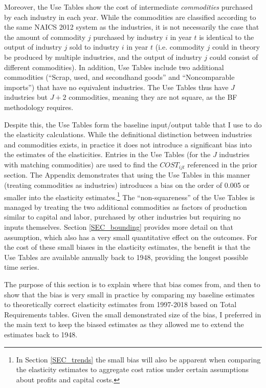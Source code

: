 Moreover, the Use Tables show the cost of intermediate \textit{commodities} purchased by each industry in each year. While the commodities are classified according to the same NAICS 2012 system as the industries, it is not necessarily the case that the amount of commodity $j$ purchased by industry $i$ in year $t$ is identical to the output of industry $j$ sold to industry $i$ in year $t$ (i.e. commodity $j$ could in theory be produced by multiple industries, and the output of industry $j$ could consist of different commodities). In addition, Use Tables include two additional commodities (``Scrap, used, and secondhand goods'' and ``Noncomparable imports'') that have no equivalent industries. The Use Tables thus have $J$ industries but $J+2$ commodities, meaning they are not square, as the BF methodology requires. 

Despite this, the Use Tables form the baseline input/output table that I use to do the elasticity calculations. While the definitional distinction between industries and commodities exists, in practice it does not introduce a significant bias into the estimates of the elasticities. Entries in the Use Tables (for the $J$ industries with matching commodities) are used to find the $COST_{ijt}$ referenced in the prior section. The Appendix demonstrates that using the Use Tables in this manner (treating commodities as industries) introduces a bias on the order of 0.005 or smaller into the elasticity estimates.\footnote{In Section \ref{SEC_trends} the small bias will also be apparent when comparing the elasticity estimates to aggregate cost ratios under certain assumptions about profits and capital costs.} The ``non-squareness'' of the Use Tables is managed by treating the two additional commodities as factors of production similar to capital and labor, purchased by other industries but requiring no inputs themselves. Section \ref{SEC_bounding} provides more detail on that assumption, which also has a very small quantitative effect on the outcomes. For the cost of these small biases in the elasticity estimates, the benefit is that the Use Tables are available annually back to 1948, providing the longest possible time series.


The purpose of this section is to explain where that bias comes from, and then to show that the bias is very small in practice by comparing my baseline estimates to theoretically correct elasticity estimates from 1997-2018 based on Total Requirements tables. Given the small demonstrated size of the bias, I preferred in the main text to keep the biased estimates as they allowed me to extend the estimates back to 1948.

